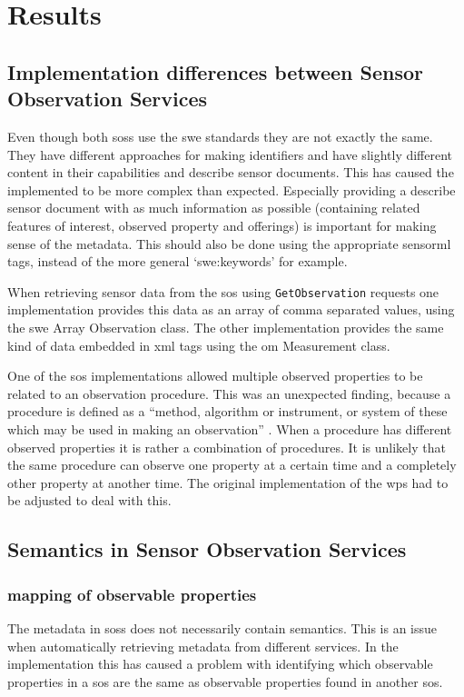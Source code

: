
\chapter{Results}
\label{chap:results}

\section{Implementation differences between Sensor Observation Services}
Even though both \aclp{sos} use the \ac{swe} standards they are not exactly the same. They have different approaches for making identifiers and have slightly different content in their capabilities and describe sensor documents. This has caused the implemented to be more complex than expected. Especially providing a describe sensor document with as much information as possible (containing related features of interest, observed property and offerings) is important for making sense of the metadata. This should also be done using the appropriate \ac{sensorml} tags, instead of the more general `swe:keywords' for example. 

When retrieving sensor data from the \ac{sos} using \texttt{GetObservation} requests one implementation provides this data as an array of comma separated values, using the \ac{swe} Array Observation class. The other implementation provides the same kind of data embedded in \ac{xml} tags using the \ac{om} Measurement class.  

One of the \ac{sos} implementations allowed multiple observed properties to be related to an observation procedure. This was an unexpected finding, because a procedure is defined as a \enquote{method, algorithm or instrument, or system of these which may be used in making an observation} \cite[p. 4]{SW:ISO}. When a procedure has different observed properties it is rather a combination of procedures. It is unlikely that the same procedure can observe one property at a certain time and a completely other property at another time. The original implementation of the \ac{wps} had to be adjusted to deal with this.  

\section{Semantics in Sensor Observation Services}
\subsection{mapping of observable properties}
The metadata in \aclp{sos} does not necessarily contain semantics. This is an issue when automatically retrieving metadata from different services. In the implementation this has caused a problem with identifying which observable properties in a \ac{sos} are the same as observable properties found in another \ac{sos}.

